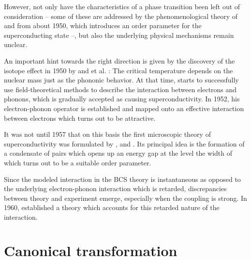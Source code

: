 However, not only have the characteristics of a phase transition been left out
of consideration -- some of these are addressed by the phenomenological theory
of  and  from about 1950, which introduces an order
parameter for the superconducting state --, but also the underlying physical
mechanisms remain unclear.

An important hint towards the right direction is given by the discovery of the
isotope effect in 1950 by  \cite{Maxwell50} and  et
al. \cite{ReynoldsSerinWrightNesbitt50}: The critical temperature depends on the
nuclear mass just as the phononic behavior. At that time,  starts
to successfully use field-theoretical methods to describe the interaction
between electrons and phonons, which is gradually accepted as causing
superconductivity. In 1952, his electron-phonon  operator is
established and mapped onto an effective interaction between electrons which
turns out to be attractive.

It was not until 1957 that on this basis the first microscopic theory of
superconductivity was formulated by ,  and
 \cites {BardeenCooperSchrieffer57a}
{BardeenCooperSchrieffer57b}. Its principal idea is the formation of a
condensate of  pairs which opens up an energy gap at the
 level the width of which turns out to be a suitable order
parameter.

Since the modeled interaction in the BCS theory is instantaneous as opposed to
the underlying electron-phonon interaction which is retarded, discrepancies
between theory and experiment emerge, especially when the coupling is strong. In
1960,  established a theory which accounts for this retarded
nature of the interaction.

\section{Canonical transformation}

